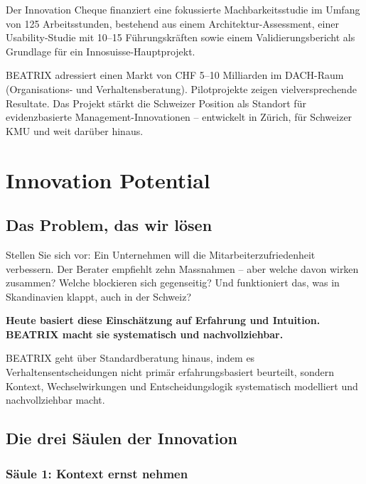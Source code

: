 \documentclass[11pt,a4paper]{article}
\begin{document}
Der Innovation Cheque finanziert eine fokussierte Machbarkeitsstudie im Umfang von 125 Arbeitsstunden, bestehend aus einem Architektur-Assessment, einer Usability-Studie mit 10--15 Führungskräften sowie einem Validierungsbericht als Grundlage für ein Innosuisse-Hauptprojekt.

BEATRIX adressiert einen Markt von CHF 5--10 Milliarden im DACH-Raum (Organisations- und Verhaltensberatung). Pilotprojekte zeigen vielversprechende Resultate. Das Projekt stärkt die Schweizer Position als Standort für evidenzbasierte Management-Innovationen -- entwickelt in Zürich, für Schweizer KMU und weit darüber hinaus.

\newpage


\section{Innovation Potential}

\subsection{Das Problem, das wir lösen}

Stellen Sie sich vor: Ein Unternehmen will die Mitarbeiterzufriedenheit verbessern. Der Berater empfiehlt zehn Massnahmen -- aber welche davon wirken zusammen? Welche blockieren sich gegenseitig? Und funktioniert das, was in Skandinavien klappt, auch in der Schweiz?

\textbf{Heute basiert diese Einschätzung auf Erfahrung und Intuition. BEATRIX macht sie systematisch und nachvollziehbar.}

BEATRIX geht über Standardberatung hinaus, indem es Verhaltensentscheidungen nicht primär erfahrungsbasiert beurteilt, sondern Kontext, Wechselwirkungen und Entscheidungslogik systematisch modelliert und nachvollziehbar macht.

\subsection{Die drei Säulen der Innovation}

\subsubsection{Säule 1: Kontext ernst nehmen}
\end{document}

